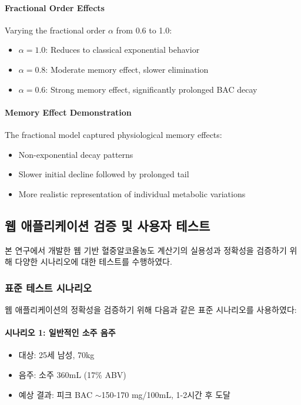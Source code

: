 \documentclass[11pt]{article}
\begin{document}
\paragraph{Fractional Order Effects}
Varying the fractional order $\alpha$ from 0.6 to 1.0:
\begin{itemize}
    \item $\alpha = 1.0$: Reduces to classical exponential behavior
    \item $\alpha = 0.8$: Moderate memory effect, slower elimination
    \item $\alpha = 0.6$: Strong memory effect, significantly prolonged BAC decay
\end{itemize}

\paragraph{Memory Effect Demonstration}
The fractional model captured physiological memory effects:
\begin{itemize}
    \item Non-exponential decay patterns
    \item Slower initial decline followed by prolonged tail
    \item More realistic representation of individual metabolic variations
\end{itemize}

\subsection{웹 애플리케이션 검증 및 사용자 테스트}

본 연구에서 개발한 웹 기반 혈중알코올농도 계산기의 실용성과 정확성을 검증하기 위해 다양한 시나리오에 대한 테스트를 수행하였다.

\subsubsection{표준 테스트 시나리오}

웹 애플리케이션의 정확성을 검증하기 위해 다음과 같은 표준 시나리오를 사용하였다:

\paragraph{시나리오 1: 일반적인 소주 음주}
\begin{itemize}
    \item 대상: 25세 남성, 70kg
    \item 음주: 소주 360mL (17\% ABV)
    \item 예상 결과: 피크 BAC $\sim$150-170 mg/100mL, 1-2시간 후 도달
\end{itemize}
\end{document}
